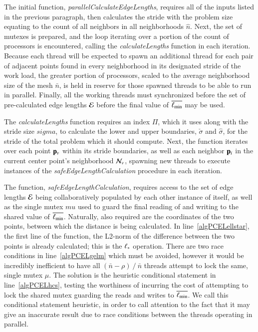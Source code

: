 
The initial function, \textit{parallelCalculateEdgeLengths}, requires all of the inputs listed in the previous paragraph, then calculates the stride with the problem size equating to the count of all neighbors in all neighborhoods $\hat{n}$. Next, the set of mutexes is prepared, and the loop iterating over a portion of the count of processors is encountered, calling the \textit{calculateLengths} function in each iteration. Because each thread will be expected to spawn an additional thread for each pair of adjacent points found in every neighborhood in its designated stride of the work load, the greater portion of processors, scaled to the average neighborhood size of the mesh $\bar{n}$, is held in reserve for those spawned threads to be able to run in parallel. Finally, all the working threads must synchronized before the set of pre-calculated edge lengths $\mathcal{E}$ before the final value of $\overline{\ell_\text{min}}$ may be used.

The \textit{calculateLengths} function requires an index $\Pi$, which it uses along with the stride size $sigma$, to calculate the lower and upper boundaries, $\check{\sigma}$ and $\hat{\sigma}$, for the stride of the total problem which it should compute. Next, the function iterates over each point $\mathbf{p}_v$ within its stride boundaries, as well as each neighbor $\mathbf{p}_i$ in the current center point's neighborhood $\mathcal{N}_v$, spawning new threads to execute instances of the \textit{safeEdgeLengthCalculation} procedure in each iteration.

The function, \textit{safeEdgeLengthCalculation}, requires access to the set of edge lengths $\mathcal{E}$ being collaboratively populated by each other instance of itself, as well as the single mutex $mu$ used to guard the final reading of and writing to the shared value of $\overline{\ell_\text{min}}$. Naturally, also required are the coordinates of the two points, between which the distance is being calculated. In line~\ref{algPCELellstar}, the first line of the function, the L2-norm of the difference between the two points is already calculated; this is the $\ell_\ast$ operation. There are two race conditions in line~\ref{algPCELgelm} which must be avoided, however it would be incredibly inefficient to have all $(\bar{n}-\rho)\mathbin{/}\bar{n}$ threads attempt to lock the same, single mutex $\mu$. The solution is the heuristic conditional statement in line~\ref{algPCELhcs}, testing the worthiness of incurring the cost of attempting to lock the shared mutex guarding the reads and writes to $\overline{\ell_\text{min}}$. We call this conditional statement heuristic, in order to call attention to the fact that it may give an inaccurate result due to race conditions between the threads operating in parallel. 


